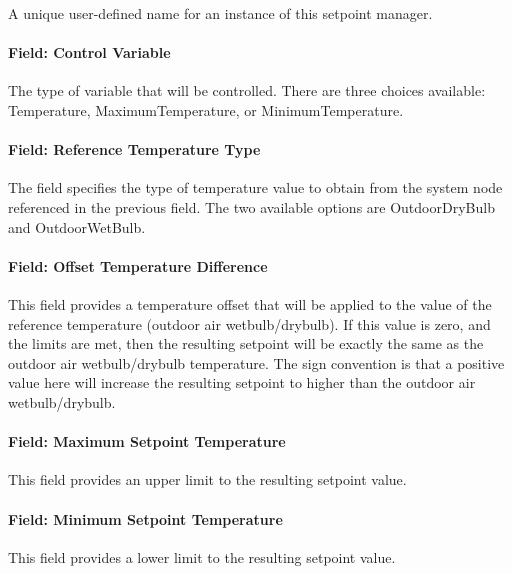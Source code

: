 A unique user-defined name for an instance of this setpoint manager.

\paragraph{Field: Control Variable}\label{field-control-variable-14}

The type of variable that will be controlled. There are three choices available: Temperature, MaximumTemperature, or MinimumTemperature.

\paragraph{Field: Reference Temperature Type}\label{field-reference-temperature-type}

The field specifies the type of temperature value to obtain from the system node referenced in the previous field. The two available options are OutdoorDryBulb and OutdoorWetBulb.

\paragraph{Field: Offset Temperature Difference}\label{field-offset-temperature-difference}

This field provides a temperature offset that will be applied to the value of the reference temperature (outdoor air wetbulb/drybulb). If this value is zero, and the limits are met, then the resulting setpoint will be exactly the same as the outdoor air wetbulb/drybulb temperature. The sign convention is that a positive value here will increase the resulting setpoint to higher than the outdoor air wetbulb/drybulb.

\paragraph{Field: Maximum Setpoint Temperature}\label{field-maximum-setpoint-temperature-6}

This field provides an upper limit to the resulting setpoint value.

\paragraph{Field: Minimum Setpoint Temperature}\label{field-minimum-setpoint-temperature-6}

This field provides a lower limit to the resulting setpoint value.

